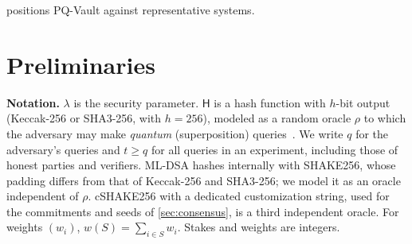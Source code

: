 \documentclass[10pt,journal,compsoc]{IEEEtran}
\theoremstyle{tplain}
\theoremstyle{tdef}
\theoremstyle{remark}
\newcommand{\cert}{\mathsf{cert}}
\newcommand{\Hash}{\mathsf{H}}
\newcommand{\RO}{\rho}
\begin{document}
 positions PQ-Vault against representative systems.

\begin{table}[t]
\centering
\caption{Positioning against related systems. \checkmark: provided; $\circ$: partial or assumed; --: not provided.}
\label{tab:related}
\scriptsize
\setlength{\tabcolsep}{2.5pt}
\end{table}

\section{Preliminaries}\label{sec:prelim}

\noindent\textbf{Notation.} $\lambda$ is the security parameter. $\Hash$ is a hash function with $h$-bit output (Keccak-256 or SHA3-256, with $h=256$), modeled as a random oracle $\RO$ to which the adversary may make \emph{quantum} (superposition) queries~\cite{boneh2011qrom}. We write $q$ for the adversary's queries and $t\ge q$ for all queries in an experiment, including those of honest parties and verifiers. ML-DSA hashes internally with SHAKE256, whose padding differs from that of Keccak-256 and SHA3-256; we model it as an oracle independent of $\RO$. cSHAKE256 with a dedicated customization string, used for the commitments and seeds of \cref{sec:consensus}, is a third independent oracle. For weights $(w_i)$, $w(S)=\sum_{i\in S}w_i$. Stakes and weights are integers.
\end{document}
